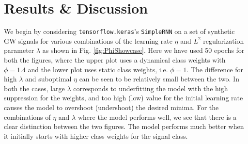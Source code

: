 \documentclass[%
reprint,
amsmath,amssymb,
aps,
]{revtex4-2}
\begin{document}
\section{Results \& Discussion}
\label{sec:results}
We begin by considering \texttt{tensorflow.keras}'s \texttt{SimpleRNN} on a set of synthetic GW signals for various combinations of the learning rate $\eta$ and $L^2$ regularization parameter $\lambda$ as shown in Fig. \ref{fig:PhiShowcase}. Here we have used 50 epochs for both the figures, where the upper plot uses a dynamical class weights with $\phi=1.4$ and the lower plot uses static class weights, i.e. $\phi=1$. The difference for high $\lambda$ and suboptimal $\eta$ can be seen to be relatively small between the two. In both the cases, large $\lambda$ corresponds to underfitting the model with the high suppression for the weights, and too high (low) value for the initial learning rate causes the model to overshoot (undershoot) the desired minima. For the combinations of $\eta$ and $\lambda$ where the model performs well, we see that there is a clear distinction between the two figures. The model performs much better when it initially starts with higher class weights for the signal class.
\end{document}
